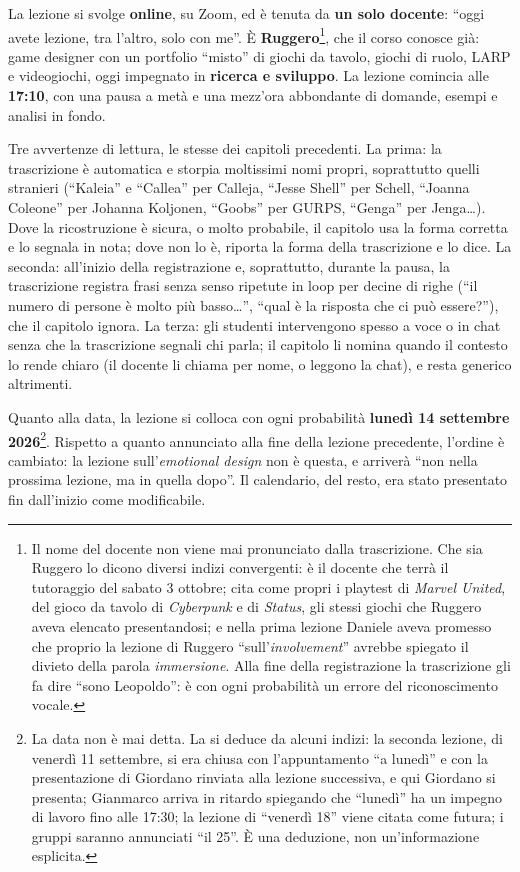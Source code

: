 La lezione si svolge \textbf{online}, su Zoom, ed è tenuta da \textbf{un solo
docente}: ``oggi avete lezione, tra l'altro, solo con me''. È
\textbf{Ruggero}\footnote{Il nome del docente non viene mai pronunciato dalla
trascrizione. Che sia Ruggero lo dicono diversi indizi convergenti: è il docente
che terrà il tutoraggio del sabato 3 ottobre; cita come propri i playtest di
\emph{Marvel United}, del gioco da tavolo di \emph{Cyberpunk} e di
\emph{Status}, gli stessi giochi che Ruggero aveva elencato presentandosi; e
nella prima lezione Daniele aveva promesso che proprio la lezione di Ruggero
``sull'\emph{involvement}'' avrebbe spiegato il divieto della parola
\emph{immersione}. Alla fine della registrazione la trascrizione gli fa dire
``sono Leopoldo'': è con ogni probabilità un errore del riconoscimento
vocale.}, che il corso conosce già: game designer con un portfolio ``misto'' di
giochi da tavolo, giochi di ruolo, LARP e videogiochi, oggi impegnato in
\textbf{ricerca e sviluppo}. La lezione comincia alle \textbf{17:10}, con una
pausa a metà e una mezz'ora abbondante di domande, esempi e analisi in fondo.

Tre avvertenze di lettura, le stesse dei capitoli precedenti. La prima: la
trascrizione è automatica e storpia moltissimi nomi propri, soprattutto quelli
stranieri (``Kaleia'' e ``Callea'' per Calleja, ``Jesse Shell'' per Schell,
``Joanna Coleone'' per Johanna Koljonen, ``Goobs'' per GURPS, ``Genga'' per
Jenga\ldots). Dove la ricostruzione è sicura, o molto probabile, il capitolo usa
la forma corretta e lo segnala in nota; dove non lo è, riporta la forma della
trascrizione e lo dice. La seconda: all'inizio della registrazione e,
soprattutto, durante la pausa, la trascrizione registra frasi senza senso
ripetute in loop per decine di righe (``il numero di persone è molto più
basso\ldots'', ``qual è la risposta che ci può essere?''), che il capitolo
ignora. La terza: gli studenti intervengono spesso a voce o in chat senza che la
trascrizione segnali chi parla; il capitolo li nomina quando il contesto lo
rende chiaro (il docente li chiama per nome, o leggono la chat), e resta
generico altrimenti.

Quanto alla data, la lezione si colloca con ogni probabilità \textbf{lunedì 14
settembre 2026}\footnote{La data non è mai detta. La si deduce da alcuni indizi:
la seconda lezione, di venerdì 11 settembre, si era chiusa con l'appuntamento
``a lunedì'' e con la presentazione di Giordano rinviata alla lezione
successiva, e qui Giordano si presenta; Gianmarco arriva in ritardo spiegando che
``lunedì'' ha un impegno di lavoro fino alle 17:30; la lezione di ``venerdì 18''
viene citata come futura; i gruppi saranno annunciati ``il 25''. È una
deduzione, non un'informazione esplicita.}. Rispetto a quanto annunciato alla
fine della lezione precedente, l'ordine è cambiato: la lezione
sull'\emph{emotional design} non è questa, e arriverà ``non nella prossima
lezione, ma in quella dopo''. Il calendario, del resto, era stato presentato fin
dall'inizio come modificabile.

